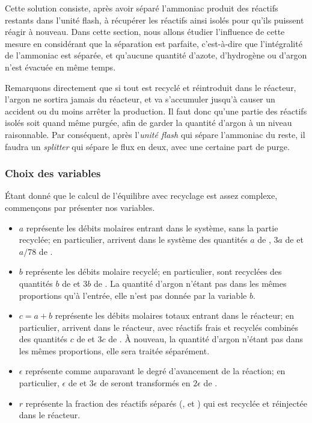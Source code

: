 Cette solution consiste, après avoir séparé l'ammoniac produit
des réactifs restants dans l'unité flash,
à récupérer les réactifs ainsi isolés pour
qu'ils puissent réagir à nouveau.
Dans cette section, nous allons étudier l'influence de cette
mesure en considérant que la séparation est parfaite, c'est-à-dire que
l'intégralité de l'ammoniac est séparée, et qu'aucune quantité d'azote,
d'hydrogène ou d'argon n'est évacuée en même temps.

Remarquons directement que si tout est recyclé et réintroduit dans le
réacteur, l'argon ne sortira jamais du réacteur, et va s'accumuler
jusqu'à causer un accident ou du moins arrêter la production.
Il faut donc qu'une partie des réactifs isolés soit quand même
purgée, afin de garder la quantité d'argon à un niveau raisonnable.
Par conséquent, après l'\emph{unité flash} qui sépare l'ammoniac du reste,
il faudra un \emph{splitter} qui sépare le flux en deux,
avec une certaine part de purge.

\subsubsection{Choix des variables}

Étant donné que le calcul de l'équilibre avec recyclage est assez complexe,
commençons par présenter nos variables.
\begin{itemize}
    \item $a$ représente les débits molaires entrant dans le système,
        sans la partie recyclée; en particulier, arrivent dans le système
        des quantités
        $a$ de , $3a$ de  et $a/78$ de .
    \item $b$ représente les débits molaire recyclé;
        en particulier, sont recyclées 
        des quantités $b$ de  et $3b$ de .
        La quantité d'argon n'étant pas dans les mêmes proportions
        qu'à l'entrée, elle n'est pas donnée par la variable $b$.
    \item $c = a+b$ représente les débits molaires
        totaux entrant dans le réacteur;
        en particulier, arrivent dans le réacteur, avec réactifs frais et
        recyclés combinés des quantités
        $c$ de  et $3c$ de .
        À nouveau, la quantité d'argon n'étant pas dans les mêmes proportions,
        elle sera traitée séparément.
    \item $\epsilon$ représente comme auparavant
        le degré d'avancement de la réaction;
        en particulier, $\epsilon$ de  et $3\epsilon$ de 
        seront transformés en $2\epsilon$ de .
    \item $r$ représente la fraction des réactifs séparés
        (,  et ) qui est recyclée et réinjectée
        dans le réacteur.
\end{itemize}

